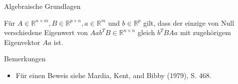 \documentclass[
  8pt,
  ignorenonframetext,
]{beamer}
\providecommand{\tightlist}{%
  \setlength{\itemsep}{0pt}\setlength{\parskip}{0pt}}
\begin{document}
\begin{frame}[fragile]{Algebraische Grundlagen}
\protect\hypertarget{algebraische-grundlagen-2}{}
\footnotesize
\begin{theorem}
\justifying
\normalfont
Für $A \in \mathbb{R}^{n \times m}, B \in \mathbb{R}^{p \times n}, a \in \mathbb{R}^m$
und $b \in \mathbb{R}^p$ gilt, dass der einzige von Null verschiedene Eigenwert von
$Aab^TB \in \mathbb{R}^{n \times n}$ gleich $b^T BAa$ mit zugehörigem Eigenvektor $Aa$ ist.
\end{theorem}

Bemerkungen

\begin{itemize}
\tightlist
\item
  Für einen Beweis siehe Mardia, Kent, and Bibby (1979), S. 468.
\end{itemize}

\vspace{1mm}
\tiny
{}
\vspace{1mm}
\tiny
{}


\end{frame}
\end{document}
